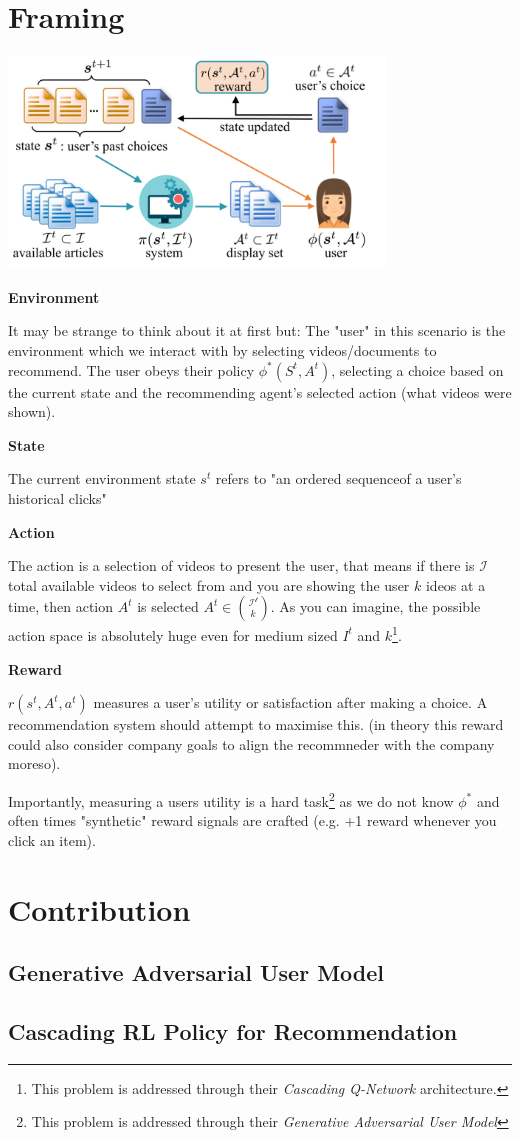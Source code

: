 \documentclass{article}
\begin{document}
    \section{Framing}
    \includegraphics[width=10cm]{fig1.png}
    
    \textbf{Environment}

    It may be strange to think about it at first but:
    The "user" in this scenario is the environment which we interact with by selecting videos/documents to recommend. The user obeys their policy $\phi ^* (S^t, A^t)$, selecting a choice based on the current state and the recommending agent's selected action (what videos were shown).

    \textbf{State}

    The current environment state $s^t$ refers to "an ordered sequenceof a user’s historical clicks"

    \textbf{Action}

    The action is a selection of videos to present the user, that means if there is $\mathcal{I}$ total available videos to select from and you are showing the user $k$ ideos at a time, then action $A^t$ is selected $A^t \in {\mathcal{I^t} \choose k}$. As you can imagine, the possible action space is absolutely huge even for medium sized $I^t$ and $k$\footnote{This problem is addressed through their \emph{Cascading Q-Network} architecture.}. 

    \textbf{Reward}

    $r(s^t, A^t, a^t)$ measures a user's utility or satisfaction after making a choice. A recommendation system should attempt to maximise this. (in theory this reward could also consider company goals to align the recommneder with the company moreso).

    Importantly, measuring a users utility is a hard task\footnote{This problem is addressed through their \emph{Generative Adversarial User Model}} as we do not know $\phi ^*$ and often times "synthetic" reward signals are crafted (e.g. +1 reward whenever you click an item).

    \section{Contribution}

    \subsection{Generative Adversarial User Model}


    \subsection{Cascading RL Policy for Recommendation}
\end{document}
